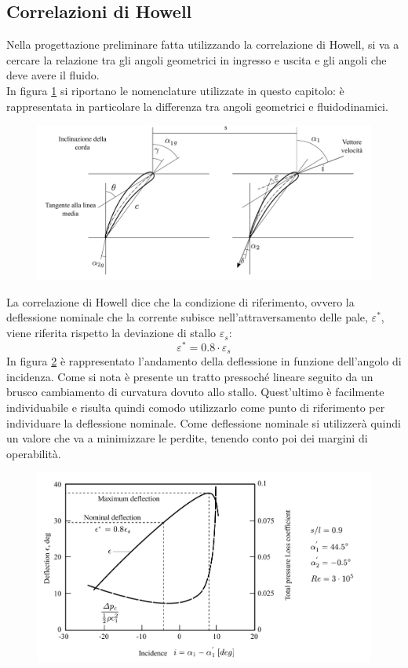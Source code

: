\subsection{Correlazioni di Howell}
Nella progettazione preliminare fatta utilizzando la correlazione di Howell, si va a cercare la relazione tra gli angoli geometrici in ingresso e uscita e gli angoli che deve avere il fluido.\\
In figura \ref{fig:SchieraDim} si riportano le nomenclature utilizzate in questo capitolo: è rappresentata in particolare la differenza tra angoli geometrici e fluidodinamici.
\begin{figure}
	\centering
	\includegraphics[width=\textwidth]{fig/SchieraDim.pdf}
	\caption{}
	\label{fig:SchieraDim}
\end{figure}
La correlazione di Howell dice che la condizione di riferimento, ovvero la deflessione nominale che la corrente subisce nell'attraversamento delle pale, $\varepsilon^*$, viene riferita rispetto la deviazione di stallo $\varepsilon_s$:
\begin{equation}
\varepsilon^* = 0.8 \cdot \varepsilon_s
\end{equation}
In figura \ref{fig:Howell} è rappresentato l'andamento della deflessione in funzione dell'angolo di incidenza. Come si nota è presente un tratto pressoché lineare seguito da un brusco cambiamento di curvatura dovuto allo stallo. Quest'ultimo è facilmente individuabile e risulta quindi comodo utilizzarlo come punto di riferimento per individuare la deflessione nominale. Come deflessione nominale si utilizzerà quindi un valore che va a minimizzare le perdite, tenendo conto poi dei margini di operabilità.  
\begin{figure}
\centering
  \includegraphics[width=\textwidth]{fig/Howell.pdf}
\caption{}
\label{fig:Howell}
\end{figure}
